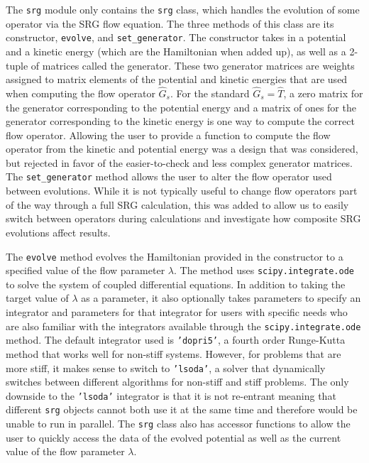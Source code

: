 The \texttt{srg} module only contains the \texttt{srg} class, which handles the evolution of some operator via the SRG flow equation. The three methods of this class are its constructor, \texttt{evolve}, and \texttt{set\_generator}. The constructor takes in a potential and a kinetic energy (which are the Hamiltonian when added up), as well as a 2-tuple of matrices called the generator. These two generator matrices are weights assigned to matrix elements of the potential and kinetic energies that are used when computing the flow operator $\hat{G}_s$. For the standard $\hat{G}_s = \hat{T}$, a zero matrix for the generator corresponding to the potential energy and a matrix of ones for the generator corresponding to the kinetic energy is one way to compute the correct flow operator. Allowing the user to provide a function to compute the flow operator from the kinetic and potential energy was a design that was considered, but rejected in favor of the easier-to-check and less complex generator matrices. The \texttt{set\_generator} method allows the user to alter the flow operator used between evolutions. While it is not typically useful to change flow operators part of the way through a full SRG calculation, this was added to allow us to easily switch between operators during calculations and investigate how composite SRG evolutions affect results.

The \texttt{evolve} method evolves the Hamiltonian provided in the constructor to a specified value of the flow parameter $\lambda$. The method uses \texttt{scipy.integrate.ode} to solve the system of coupled differential equations. In addition to taking the target value of $\lambda$ as a parameter, it also optionally takes parameters to specify an integrator and parameters for that integrator for users with specific needs who are also familiar with the integrators available through the \texttt{scipy.integrate.ode} method. The default integrator used is \texttt{'dopri5'}, a fourth order Runge-Kutta method that works well for non-stiff systems. However, for problems that are more stiff, it makes sense to switch to \texttt{'lsoda'}, a solver that dynamically switches between different algorithms for non-stiff and stiff problems. The only downside to the \texttt{'lsoda'} integrator is that it is not re-entrant meaning that different \texttt{srg} objects cannot both use it at the same time and therefore would be unable to run in parallel. The \texttt{srg} class also has accessor functions to allow the user to quickly access the data of the evolved potential as well as the current value of the flow parameter $\lambda$.


